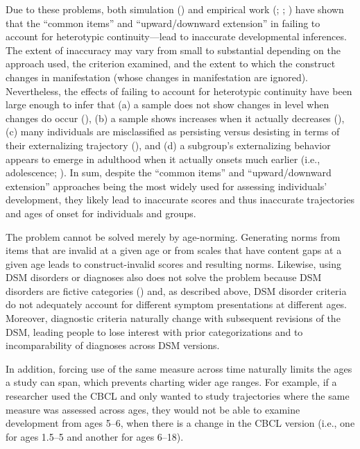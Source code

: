 \documentclass[
  american,
  letterpaper,
  12pt]{article}
\begin{document}
Due to these problems, both simulation
() and empirical work
(;
;
) have
shown that the ``common items'' and ``upward/downward extension'' in
failing to account for heterotypic continuity---lead to inaccurate
developmental inferences. The extent of inaccuracy may vary from small
to substantial depending on the approach used, the criterion examined,
and the extent to which the construct changes in manifestation (whose
changes in manifestation are ignored). Nevertheless, the effects of
failing to account for heterotypic continuity have been large enough to
infer that (a) a sample does not show changes in level when changes do
occur (), (b) a sample
shows increases when it actually decreases
(), (c) many
individuals are misclassified as persisting versus desisting in terms of
their externalizing trajectory (), and (d) a subgroup's externalizing behavior
appears to emerge in adulthood when it actually onsets much earlier
(i.e., adolescence; ). In sum, despite the ``common items'' and ``upward/downward
extension'' approaches being the most widely used for assessing
individuals' development, they likely lead to inaccurate scores and thus
inaccurate trajectories and ages of onset for individuals and groups.

The problem cannot be solved merely by age-norming. Generating norms
from items that are invalid at a given age or from scales that have
content gaps at a given age leads to construct-invalid scores and
resulting norms. Likewise, using DSM disorders or diagnoses also does
not solve the problem because DSM disorders are fictive categories
() and, as described above,
DSM disorder criteria do not adequately account for different symptom
presentations at different ages. Moreover, diagnostic criteria naturally
change with subsequent revisions of the DSM, leading people to lose
interest with prior categorizations and to incomparability of diagnoses
across DSM versions.

In addition, forcing use of the same measure across time naturally
limits the ages a study can span, which prevents charting wider age
ranges. For example, if a researcher used the CBCL and only wanted to
study trajectories where the same measure was assessed across ages, they
would not be able to examine development from ages 5--6, when there is a
change in the CBCL version (i.e., one for ages 1.5--5 and another for
ages 6--18).
\end{document}
